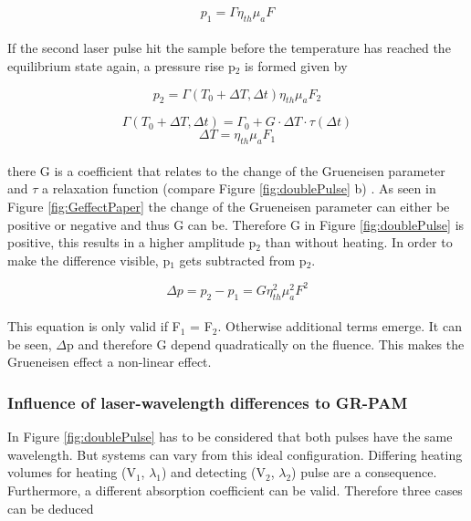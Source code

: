\begin{equation}
	p_1 = \Gamma \eta_{th} \mu_a F
\end{equation}
\\
If the second laser pulse hit the sample before the temperature has reached the equilibrium state again, a pressure rise p$_2$ is formed given by

\begin{equation}
	p_2 = \Gamma(T_0 + \Delta T, \Delta t) \eta_{th} \mu_a F_2
	\label{eq:grPA2}
\end{equation} 

\begin{equation}
\Gamma(T_0 + \Delta T, \Delta t) = \Gamma_0 + G \cdot \Delta T \cdot \tau(\Delta t)
\end{equation} 
\begin{equation}
\Delta T = \eta_{th} \mu_a F_1
\end{equation} 
\\
there G is a coefficient that relates to the change of the Grueneisen parameter and $\tau$ a relaxation function (compare Figure \ref{fig:doublePulse} b) \cite{Ma:GRPAMinVivo,Tian:15}. As seen in Figure \ref{fig:GeffectPaper} the change of the Grueneisen parameter can either be positive or negative and thus G can be. Therefore G in Figure \ref{fig:doublePulse} is positive, this results in a higher amplitude p$_2$ than without heating. In order to make the difference visible, p$_1$ gets subtracted from p$_2$. 

\begin{equation}
	\Delta p = p_2 - p_1 = G \eta_{th}^2 \mu_a^2 F^2
	\label{deltaP}
\end{equation}
\\
This equation is only valid if F$_1$ = F$_2$. Otherwise additional terms emerge. It can be seen, $\Delta$p and therefore G depend quadratically on the fluence. This makes the Grueneisen effect a non-linear effect.\\

\subsubsection{Influence of laser-wavelength differences to GR-PAM}

In Figure \ref{fig:doublePulse} has to be considered that both pulses have the same wavelength. But systems can vary from this ideal configuration. Differing heating volumes for heating (V$_1$, $\lambda_1$) and detecting (V$_2$, $\lambda_2$) pulse are a consequence. Furthermore, a different absorption coefficient can be valid. Therefore three cases can be deduced\\

